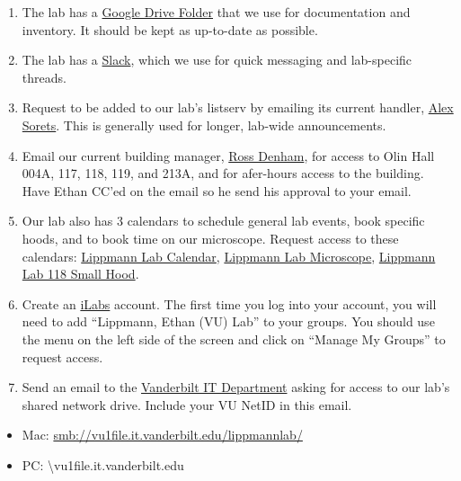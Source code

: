 \documentclass[
]{book}
\begin{document}
\begin{enumerate}
\def\labelenumi{\arabic{enumi}.}
\item
  The lab has a \href{https://drive.google.com/drive/folders/0Bwvn9S-4oeMmeHhzUS1nM0FNak0?usp=sharing}{Google Drive Folder} that we use for documentation and inventory. It should be kept as up-to-date as possible.
\item
  The lab has a \href{https://lippmann-lab.slack.com/join/signup\#/}{Slack}, which we use for quick messaging and lab-specific threads.
\item
  Request to be added to our lab's listserv by emailing its current handler, \href{mailto:alexander.g.sorets@vanderbilt.edu}{Alex Sorets}. This is generally used for longer, lab-wide announcements.
\item
  Email our current building manager, \href{mailto:ross.denham@vanderbilt.edu}{Ross Denham}, for access to Olin Hall 004A, 117, 118, 119, and 213A, and for afer-hours access to the building. Have Ethan CC'ed on the email so he send his approval to your email.
\item
  Our lab also has 3 calendars to schedule general lab events, book specific hoods, and to book time on our microscope. Request access to these calendars: \href{https://calendar.google.com/calendar/u/0?cid=bXFkOWE3bjM3MTkxbzluYWVtbWw0NDd2bGtAZ3JvdXAuY2FsZW5kYXIuZ29vZ2xlLmNvbQ}{Lippmann Lab Calendar}, \href{https://calendar.google.com/calendar/u/0?cid=ZjNkMXBkbmFwZzc0NWR2YmVmNXU0bGN1YjBAZ3JvdXAuY2FsZW5kYXIuZ29vZ2xlLmNvbQ}{Lippmann Lab Microscope}, \href{https://calendar.google.com/calendar/u/0?cid=MGk3NGZpdm5ua2JyZjMyc2duNTE2aGMxOWdAZ3JvdXAuY2FsZW5kYXIuZ29vZ2xlLmNvbQ}{Lippmann Lab 118 Small Hood}.
\item
  Create an \href{https://vanderbilt.corefacilities.org/landing/2191}{iLabs} account. The first time you log into your account, you will need to add ``Lippmann, Ethan (VU) Lab'' to your groups. You should use the menu on the left side of the screen and click on ``Manage My Groups'' to request access.
\item
  Send an email to the \href{mailto:dts.se.support@Vanderbilt.Edu}{Vanderbilt IT Department} asking for access to our lab's shared network drive. Include your VU NetID in this email.
\end{enumerate}

\begin{itemize}
\item
  Mac: \url{smb://vu1file.it.vanderbilt.edu/lippmannlab/}
\item
  PC: \textbackslash vu1file.it.vanderbilt.edu\lippmannlab\\
\end{itemize}
\end{document}

